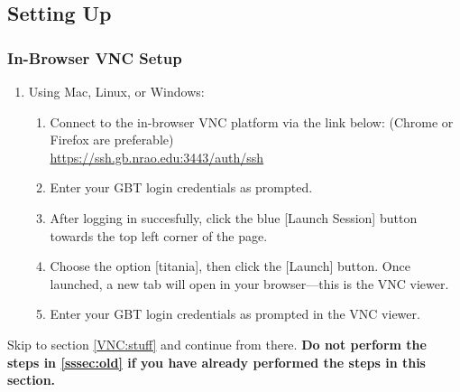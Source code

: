 \documentclass[11pt]{article}
\begin{document}
\subsection{Setting Up}\label{ssec:qa} %
\subsubsection{In-Browser VNC Setup}\label{sssec:new} %
\begin{enumerate}
\item Using Mac, Linux, or Windows: 
 \begin{enumerate}
  \item Connect to the in-browser VNC platform via the link below: (Chrome or Firefox are preferable)\\ 
  \href{https://ssh.gb.nrao.edu:3443/auth/ssh}{https://ssh.gb.nrao.edu:3443/auth/ssh}
  \item Enter your GBT login credentials as prompted.
  \item After logging in succesfully, click the blue [Launch Session] button towards the top left corner of the page.
  \item Choose the option [titania], then click the [Launch] button. Once launched, a new tab will open in your browser---this is the VNC viewer.
  \item Enter your GBT login credentials as prompted in the VNC viewer.\\
 \end{enumerate}
\end{enumerate}

\noindent Skip to section \ref{VNC:stuff} and continue from there. {\bfseries {Do not perform the steps in \ref{sssec:old} if you have already performed the steps in this section.}}
\end{document}
